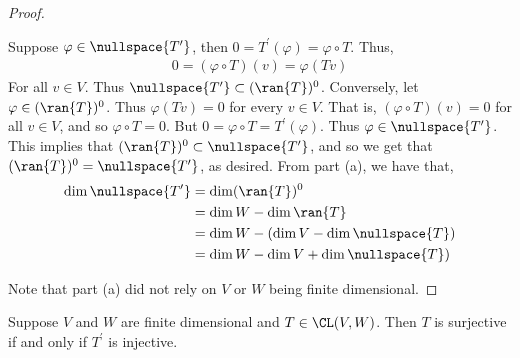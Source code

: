 \documentclass{article}
\begin{document}
  \begin{proof}
    \begin{enumerate}[label=\alph*)]
      \ii 
        Suppose $\varphi \in \nullspace{T^{\prime}}$, then $0 = T^{\prime}(\varphi) = \varphi \circ T$. Thus,
        \begin{align*}
          0 = (\varphi \circ T)(v) = \varphi(Tv)
        \end{align*}
        For all $v \in V$. Thus $\nullspace{T^{\prime}} \subset (\ran{T})^0$. Conversely, let $\varphi \in (\ran{T})^0$. Thus $\varphi(Tv) = 0$ for every $v \in V$. That is, $(\varphi \circ
        T)(v) = 0$ for all $v \in V$, and so $\varphi \circ T = 0$.  But $0 = \varphi \circ T = T^{\prime}(\varphi)$. Thus $\varphi \in \nullspace{T^{\prime}}$. This implies that
        $(\ran{T})^0 \subset \nullspace{T^{\prime}}$, and so we get that $(\ran{T})^0 = \nullspace{T^{\prime}}$, as desired.
      \ii 
        From part (a), we have that,
        \begin{align*}
          \dim\nullspace{T^{\prime}} & = \dim(\ran{T})^0 \\
          & = \dim W - \dim\ran{T} \\
          & = \dim W - (\dim V - \dim\nullspace{T}) \\
          & = \dim W - \dim V + \dim\nullspace{T}) \\
        \end{align*}
    \end{enumerate}
    Note that part (a) did not rely on $V$ or $W$ being finite dimensional. 
  \end{proof}
  \begin{prop}
    Suppose $V$ and $W$ are finite dimensional and $T \in \CL(V, W)$. Then $T$ is surjective if and only if $T^{\prime}$ is injective.
  \end{prop}
\end{document}
